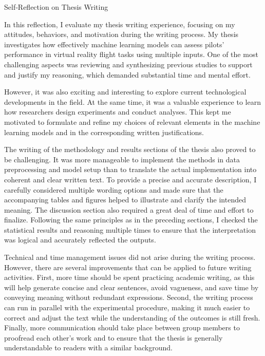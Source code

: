 \documentclass[12pt,a4paper]{article}
\begin{document}
	
	\begin{center}
		\Large Self‑Reflection on Thesis Writing
	\end{center}
	
	\onehalfspacing
	
	In this reflection, I evaluate my thesis writing experience, focusing on my attitudes, behaviors, and motivation during the writing process. My thesis investigates how effectively machine learning models can assess pilots’ performance in virtual reality flight tasks using multiple inputs. One of the most challenging aspects was reviewing and synthesizing previous studies to support and justify my reasoning, which demanded substantial time and mental effort.

	However, it was also exciting and interesting to explore current technological developments in the field. At the same time, it was a valuable experience to learn how researchers design experiments and conduct analyses. This kept me motivated to formulate and refine my choices of relevant elements in the machine learning models and in the corresponding written justifications.
	
	The writing of the methodology and results sections of the thesis also proved to be challenging. It was more manageable to implement the methods in data preprocessing and model setup than to translate the actual implementation into coherent and clear written text. To provide a precise and accurate description, I carefully considered multiple wording options and made sure that the accompanying tables and figures helped to illustrate and clarify the intended meaning. The discussion section also required a great deal of time and effort to finalize. Following the same principles as in the preceding sections, I checked the statistical results and reasoning multiple times to ensure that the interpretation was logical and accurately reflected the outputs.
	
	Technical and time management issues did not arise during the writing process. However, there are several improvements that can be applied to future writing activities. First, more time should be spent practicing academic writing, as this will help generate concise and clear sentences, avoid vagueness, and save time by conveying meaning without redundant expressions. Second, the writing process can run in parallel with the experimental procedure, making it much easier to correct and adjust the text while the understanding of the outcomes is still fresh. Finally, more communication should take place between group members to proofread each other’s work and to ensure that the thesis is generally understandable to readers with a similar background.
	
\end{document}
